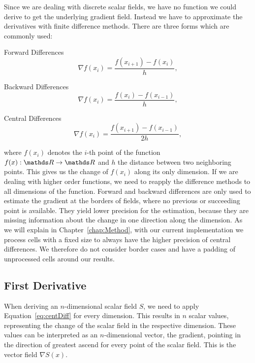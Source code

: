 Since we are dealing with discrete scalar fields, we have no function we
could derive to get the underlying gradient field. Instead we have to
approximate the derivatives with finite difference methods. There are
three forms which are commonly used:\\
\begin{inparaenum}[(a)]
  \item Forward Differences
  \begin{equation}
    \nabla f(x_i) = \frac{f(x_{i+1}) - f(x_i)}{h},
  \end{equation}
  \item Backward Differences
  \begin{equation}
    \nabla f(x_i) = \frac{f(x_i) - f(x_{i-1})}{h},
  \end{equation}
  \item Central Differences
  \begin{equation}\label{eq:centDiff}
    \nabla f(x_i) = \frac{f(x_{i+1}) - f(x_{i-1})}{2h},
  \end{equation}
\end{inparaenum}
where $f(x_i)$ denotes the $i$-th point of the function $f(x): \real
\rightarrow \real$ and $h$ the distance between two neighboring points.
This gives us the change of $f(x_i)$ along its only dimension. If we are
dealing with higher order functions, we need to reapply the difference
methods to all dimensions of the function. Forward and backward
differences are only used to estimate the gradient at the borders of
fields, where no previous or succeeding point is available. They yield
lower precision for the estimation, because they are missing information
about the change in one direction along the dimension. As we will
explain in Chapter~\ref{chap:Method}, with our current implementation we
process cells with a fixed size to always have the higher precision of
central differences. We therefore do not consider border cases and have
a padding of unprocessed cells around our results.

\subsection{First Derivative}

When deriving an $n$-dimensional scalar field $S$, we need to apply
Equation~\ref{eq:centDiff} for every dimension. This results in $n$
scalar values, representing the change of the scalar field in the
respective dimension. These values can be interpreted as an
$n$-dimensional vector, the gradient, pointing in the direction of
greatest ascend for every point of the scalar field. This is the
vector field $\nabla S(x)$.

